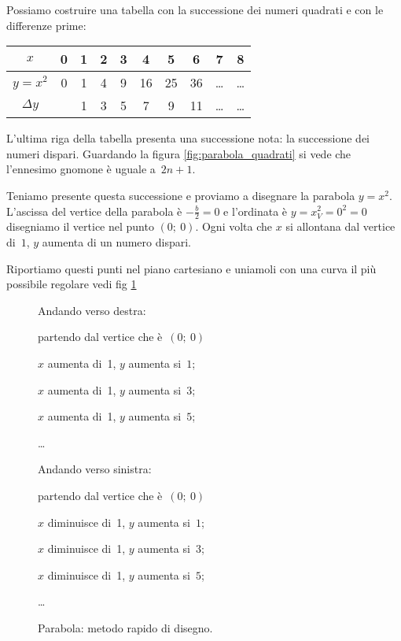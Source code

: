 Possiamo costruire una tabella con la successione dei numeri quadrati e con 
le differenze prime:

\begin{center}
  \begin{tabular}{c c c c c c c c c c}
   $x$        & 0 & 1 & 2 & 3 & 4 & 5 & 6 & 7 & 8 \\
   \hline
   $y=x^2$    & 0 & 1 & 4 & 9 & 16 & 25 & 36 & \ldots & \ldots \\
   \hline
   $\Delta y$ &  & 1 & 3 & 5 & 7 & 9 & 11 & \ldots & \ldots \\
  \end{tabular}
\end{center}
L'ultima riga della tabella presenta una successione nota: la successione dei 
numeri dispari. Guardando la figura \ref{fig:parabola_quadrati} si vede che 
l'ennesimo gnomone è uguale a~$2n+1$. 

Teniamo presente questa successione e proviamo a disegnare la parabola $y=x^2$.
L'ascissa del vertice della parabola è $-\frac{b}{2}=0$ e l'ordinata è 
$y=x_V^2=0^2=0$ disegniamo il vertice nel punto $(0;~0)$. Ogni volta che $x$ 
si allontana dal vertice di~$1$, $y$ aumenta di un numero dispari. 

Riportiamo questi punti nel piano cartesiano e uniamoli con una curva il più 
possibile regolare vedi fig \ref{fig:parabola_parabola0}


\begin{figure}[p]
\begin{minipage}{.50\textwidth}
Andando verso destra:
 \begin{itemize*}
 \item partendo dal vertice che è~$(0;~0)$
 \item $x$ aumenta di~1, $y$ aumenta si~$1$;
 \item $x$ aumenta di~1, $y$ aumenta si~$3$;
 \item $x$ aumenta di~1, $y$ aumenta si~$5$;
 \item \dots
\end{itemize*}
Andando verso sinistra:
\begin{itemize*}
 \item partendo dal vertice che è~$(0;~0)$
 \item $x$ diminuisce di~1, $y$ aumenta si~$1$;
 \item $x$ diminuisce di~1, $y$ aumenta si~$3$;
 \item $x$ diminuisce di~1, $y$ aumenta si~$5$;
 \item \dots
\end{itemize*}
\end{minipage}
\begin{minipage}{.50\textwidth}
\begin{inaccessibleblock}[Parabola di equazione $y=x^2$.]
\centering
  \disrapido
  \caption{Parabola: metodo rapido di disegno.} \label{fig:parabola_parabola0}
\end{inaccessibleblock}
\end{minipage}
\end{figure}

